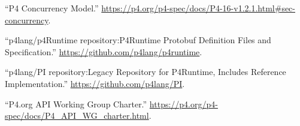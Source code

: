 \documentclass[11pt]{article}
\begin{document}
{{\begin{thebibliography}{45}
\mdbibitemlabel{{}[18]}\textquotedblleft{}P4 Concurrency Model.\textquotedblright{} \href{https://p4.org/p4-spec/docs/P4-16-v1.2.1.html\%23sec-concurrency}{{\ttfamily https://\hspace{0pt}p4.\hspace{0pt}org/\hspace{0pt}p4-\hspace{0pt}spec/\hspace{0pt}docs/\hspace{0pt}P4-\hspace{0pt}16-\hspace{0pt}v1.\hspace{0pt}2.\hspace{0pt}1.\hspace{0pt}html\#\hspace{0pt}sec-\hspace{0pt}concurrency}}.\label{p4concurrency}%

\mdbibitemlabel{{}[19]}\textquotedblleft{}p4lang/p4Runtime repository:P4Runtime Protobuf Definition Files and Specification.\textquotedblright{} \href{https://github.com/p4lang/p4runtime}{{\ttfamily https://\hspace{0pt}github.\hspace{0pt}com/\hspace{0pt}p4lang/\hspace{0pt}p4runtime}}.\label{p4runtimerepo}%

\mdbibitemlabel{{}[20]}\textquotedblleft{}p4lang/PI repository:Legacy Repository for P4Runtime, Includes Reference Implementation.\textquotedblright{} \href{https://github.com/p4lang/PI}{{\ttfamily https://\hspace{0pt}github.\hspace{0pt}com/\hspace{0pt}p4lang/\hspace{0pt}PI}}.\label{pirepo}%

\mdbibitemlabel{{}[21]}\textquotedblleft{}P4.org API Working Group Charter.\textquotedblright{} \href{https://p4.org/p4-spec/docs/P4_API_WG_charter.html}{{\ttfamily https://\hspace{0pt}p4.\hspace{0pt}org/\hspace{0pt}p4-\hspace{0pt}spec/\hspace{0pt}docs/\hspace{0pt}P4\_\hspace{0pt}API\_\hspace{0pt}WG\_\hspace{0pt}charter.\hspace{0pt}html}}.\label{p4apiwgcharter}%


\end{thebibliography}}}
\end{document}

